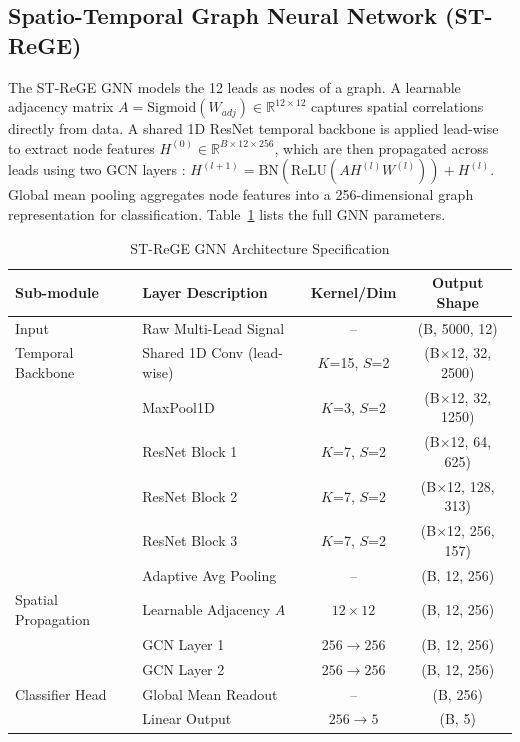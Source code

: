 \documentclass[14pt]{extarticle}
\begin{document}
\subsection{Spatio-Temporal Graph Neural Network (ST-ReGE)}
The ST-ReGE GNN \cite{zhang2023strege} models the 12 leads as nodes of a graph. A learnable adjacency matrix $A = \text{Sigmoid}(W_{adj}) \in \mathbb{R}^{12 \times 12}$ captures spatial correlations directly from data. A shared 1D ResNet temporal backbone is applied lead-wise to extract node features $H^{(0)} \in \mathbb{R}^{B \times 12 \times 256}$, which are then propagated across leads using two GCN layers \cite{kipf2016semi}: $H^{(l+1)} = \text{BN}(\text{ReLU}(A H^{(l)} W^{(l)})) + H^{(l)}$. Global mean pooling aggregates node features into a 256-dimensional graph representation for classification. Table~\ref{tab:gnn_arch} lists the full GNN parameters.

\begin{table}[H]
\caption{ST-ReGE GNN Architecture Specification}
\label{tab:gnn_arch}
\centering
\begin{tabular}{|l|l|c|c|}
\hline
\textbf{Sub-module} & \textbf{Layer Description} & \textbf{Kernel/Dim} & \textbf{Output Shape} \\
\hline
Input & Raw Multi-Lead Signal & -- & (B, 5000, 12) \\
\hline
Temporal Backbone & Shared 1D Conv (lead-wise) & $K$=15, $S$=2 & (B$\times$12, 32, 2500) \\
\hline
 & MaxPool1D & $K$=3, $S$=2 & (B$\times$12, 32, 1250) \\
\hline
 & ResNet Block 1 & $K$=7, $S$=2 & (B$\times$12, 64, 625) \\
\hline
 & ResNet Block 2 & $K$=7, $S$=2 & (B$\times$12, 128, 313) \\
\hline
 & ResNet Block 3 & $K$=7, $S$=2 & (B$\times$12, 256, 157) \\
\hline
 & Adaptive Avg Pooling & -- & (B, 12, 256) \\
\hline
Spatial Propagation & Learnable Adjacency $A$ & $12\times12$ & (B, 12, 256) \\
\hline
 & GCN Layer 1 & $256\to256$ & (B, 12, 256) \\
\hline
 & GCN Layer 2 & $256\to256$ & (B, 12, 256) \\
\hline
Classifier Head & Global Mean Readout & -- & (B, 256) \\
\hline
 & Linear Output & $256\to5$ & (B, 5) \\
\hline
\end{tabular}
\end{table}
\end{document}

